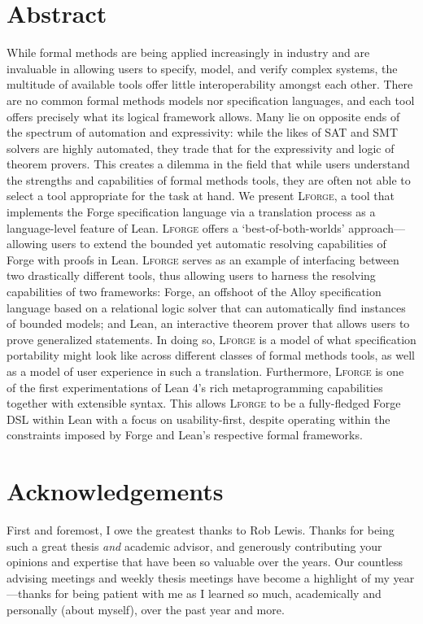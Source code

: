 \newpage
\section*{Abstract}
While formal methods are being applied increasingly in industry and are invaluable in allowing users to specify, model, and verify complex systems, the multitude of available tools offer little interoperability amongst each other. 
There are no common formal methods models nor specification languages, and each tool offers precisely what its logical framework allows. 
Many lie on opposite ends of the spectrum of automation and expressivity: while the likes of SAT and SMT solvers are highly automated, they trade that for the expressivity and logic of theorem provers. 
This creates a dilemma in the field that while users understand the strengths and capabilities of formal methods tools, they are often not able to select a tool appropriate for the task at hand. 
We present \textsc{Lforge}, a tool that implements the Forge specification language via a translation process as a language-level feature of Lean. 
\textsc{Lforge} offers a `best-of-both-worlds' approach---allowing users to extend the bounded yet automatic resolving capabilities of Forge with proofs in Lean.
\textsc{Lforge} serves as an example of interfacing between two drastically different tools, thus allowing users to harness the resolving capabilities of two frameworks: Forge, an offshoot of the Alloy specification language based on a relational logic solver that can automatically find instances of bounded models; and Lean, an interactive theorem prover that allows users to prove generalized statements. 
In doing so, \textsc{Lforge} is a model of what specification portability might look like across different classes of formal methods tools, as well as a model of user experience in such a translation. 
Furthermore, \textsc{Lforge} is one of the first experimentations of Lean 4's rich metaprogramming capabilities together with extensible syntax. This allows \textsc{Lforge} to be a fully-fledged Forge DSL within Lean with a focus on usability-first, despite operating within the constraints imposed by Forge and Lean's respective formal frameworks. 

\newpage
\section*{Acknowledgements}

First and foremost, I owe the greatest thanks to Rob Lewis. Thanks for being such a great thesis \emph{and} academic advisor, and generously contributing your opinions and expertise that have been so valuable over the years. Our countless advising meetings and weekly thesis meetings have become a highlight of my year---thanks for being patient with me as I learned so much, academically and personally (about myself), over the past year and more. 

